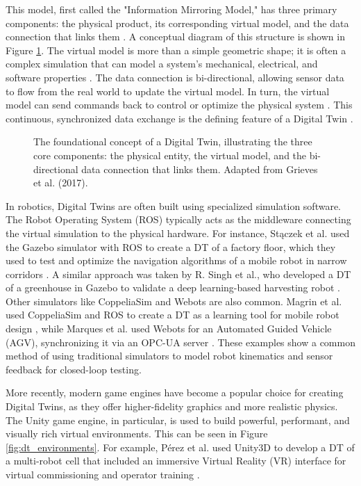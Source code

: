 This model, first called the "Information Mirroring Model," has three primary components: the physical product, its corresponding virtual model, and the data connection that links them \cite{Grieves2017, AA23}. A conceptual diagram of this structure is shown in Figure \ref{fig:dt_concept}. The virtual model is more than a simple geometric shape; it is often a complex simulation that can model a system's mechanical, electrical, and software properties \cite{Leng2021}. The data connection is bi-directional, allowing sensor data to flow from the real world to update the virtual model. In turn, the virtual model can send commands back to control or optimize the physical system \cite{Grieves2017, Leng2021}. This continuous, synchronized data exchange is the defining feature of a Digital Twin \cite{AA23}.

\begin{figure}[h]
\centering
\caption{The foundational concept of a Digital Twin, illustrating the three core components: the physical entity, the virtual model, and the bi-directional data connection that links them. Adapted from Grieves et al. (2017).}
\label{fig:dt_concept}
\end{figure}

In robotics, Digital Twins are often built using specialized simulation software. The Robot Operating System (ROS) typically acts as the middleware connecting the virtual simulation to the physical hardware. For instance, Stączek et al. used the Gazebo simulator with ROS to create a DT of a factory floor, which they used to test and optimize the navigation algorithms of a mobile robot in narrow corridors \cite{Staczek2021}. A similar approach was taken by R. Singh et al., who developed a DT of a greenhouse in Gazebo to validate a deep learning-based harvesting robot \cite{Singh2024a}. Other simulators like CoppeliaSim and Webots are also common. Magrin et al. used CoppeliaSim and ROS to create a DT as a learning tool for mobile robot design \cite{Magrin2021}, while Marques et al. used Webots for an Automated Guided Vehicle (AGV), synchronizing it via an OPC-UA server \cite{Marques2024}. These examples show a common method of using traditional simulators to model robot kinematics and sensor feedback for closed-loop testing.

More recently, modern game engines have become a popular choice for creating Digital Twins, as they offer higher-fidelity graphics and more realistic physics. The Unity game engine, in particular, is used to build powerful, performant, and visually rich virtual environments. This can be seen in Figure \ref{fig:dt_environments}. For example, Pérez et al. used Unity3D to develop a DT of a multi-robot cell that included an immersive Virtual Reality (VR) interface for virtual commissioning and operator training \cite{Perez2020}.

